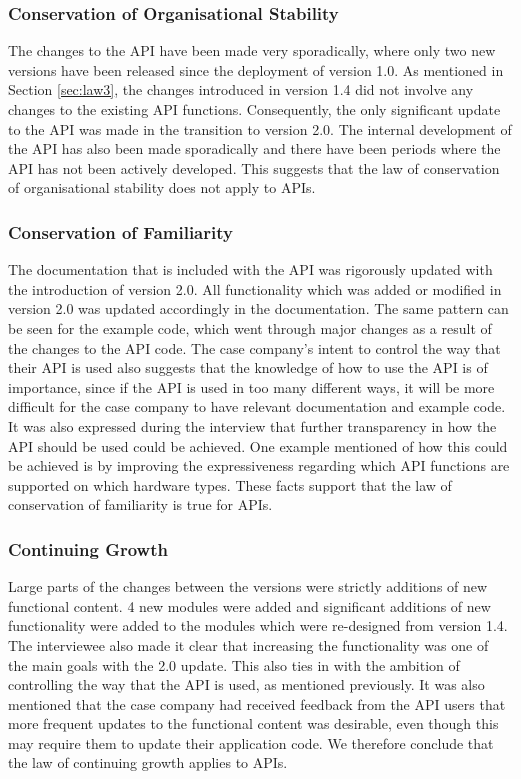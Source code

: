 \documentclass{sig-alternate}
\begin{document}
\subsubsection{Conservation of Organisational Stability} %
The changes to the API have been made very sporadically, where only two new versions have been released since the deployment of version 1.0. As mentioned in Section \ref{sec:law3}, the changes introduced in version 1.4 did not involve any changes to the existing API functions. Consequently, the only significant update to the API was made in the transition to version 2.0. The internal development of the API has also been made sporadically and there have been periods where the API has not been actively developed. This suggests that the law of conservation of organisational stability does not apply to APIs. 

\subsubsection{Conservation of Familiarity} %
The documentation that is included with the API was rigorously updated with the introduction of version 2.0. All functionality which was added or modified in version 2.0 was updated accordingly in the documentation. The same pattern can be seen for the example code, which went through major changes as a result of the changes to the API code. The case company's intent to control the way that their API is used also suggests that the knowledge of how to use the API is of importance, since if the API is used in too many different ways, it will be more difficult for the case company to have relevant documentation and example code. It was also expressed during the interview that further transparency in how the API should be used could be achieved. One example mentioned of how this could be achieved is by improving the expressiveness regarding which API functions are supported on which hardware types. These facts support that the law of conservation of familiarity is true for APIs. 

\subsubsection{Continuing Growth} %
Large parts of the changes between the versions were strictly additions of new functional content. 4 new modules were added and significant additions of new functionality were added to the modules which were re-designed from version 1.4. The interviewee also made it clear that increasing the functionality was one of the main goals with the 2.0 update. This also ties in with the ambition of controlling the way that the API is used, as mentioned previously. It was also mentioned that the case company had received feedback from the API users that more frequent updates to the functional content was desirable, even though this may require them to update their application code. We therefore conclude that the law of continuing growth applies to APIs. 
\end{document}
